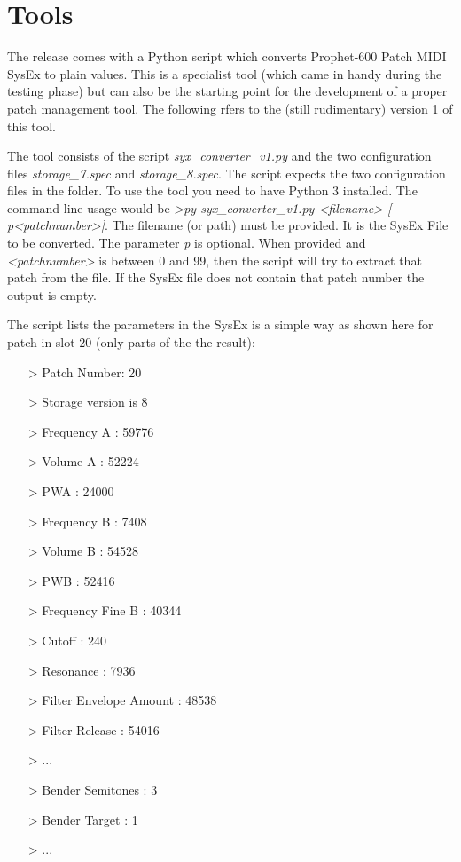 \documentclass[landscape, 11pt, oneside]{report}
\begin{document}


\section{Tools}

The release comes with a Python script which converts Prophet-600 Patch MIDI SysEx to plain values. This is a specialist tool (which came in handy during the testing phase) but can also be the starting point for the development of a proper patch management tool. The following rfers to the (still rudimentary) version 1 of this tool.

The tool consists of the script \textit{syx\_converter\_v1.py} and the two configuration files \textit{storage\_7.spec} and \textit{storage\_8.spec}. The script expects the two configuration files in the folder. To use the tool you need to have Python 3 installed. The command line usage would be \textit{>py syx\_converter\_v1.py <filename> [-p<patchnumber>]}. The filename (or path) must be provided. It is the SysEx File to be converted. The parameter \textit{p} is optional. When provided and \textit{<patchnumber>} is between 0 and 99, then the script will try to extract that patch from the file. If the SysEx file does not contain that patch number the output is empty.

The script lists the parameters in the SysEx is a simple way as shown here for patch in slot 20 (only parts of the the result):

\begin{itemize}
  \item[>] Patch Number:  20 
  \item[>] Storage version is 8
  \item[>] Frequency A :  59776
  \item[>] Volume A :  52224
  \item[>] PWA :  24000 
  \item[>] Frequency B :  7408 
  \item[>] Volume B :  54528
  \item[>] PWB :  52416
  \item[>] Frequency Fine B :  40344
  \item[>] Cutoff :  240
  \item[>] Resonance :  7936
  \item[>] Filter Envelope Amount :  48538
  \item[>] Filter Release :  54016
  \item[>] ...  
  \item[>] Bender Semitones :  3
  \item[>] Bender Target :  1
  \item[>] ...  
\end{itemize}
\end{document}

